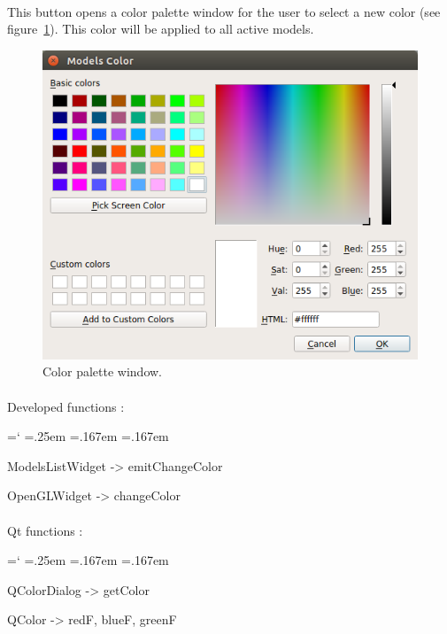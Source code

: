 \documentclass[12pt]{report}
\DeclareRobustCommand*{\ttfamily}{
  \origttfamily
  \hyphenchar\font=`\-\relax
  \fontdimen3\font=.25em\relax
  \fontdimen4\font=.167em\relax
  \fontdimen7\font=.167em\relax
}
\newenvironment{code}{\ttfamily}{}
\begin{document}
\paragraph{}
	This button opens a color palette window for the user to select a new color (see figure~\ref{changecolor}). This color will be applied to all active models.

\begin{figure}[H]
\centerline{\includegraphics[scale = 0.5]{img/changeColor.png}}
\caption{Color palette window.}
\label{changecolor}
\end{figure}

\paragraph{}
	Developed functions :

	\begin{code}
	ModelsListWidget -> emitChangeColor
	
	OpenGLWidget -> changeColor
	\end{code}

\paragraph{}
	Qt functions :

	\begin{code}
	QColorDialog -> getColor

	QColor -> redF, blueF, greenF
	\end{code}
\end{document}

